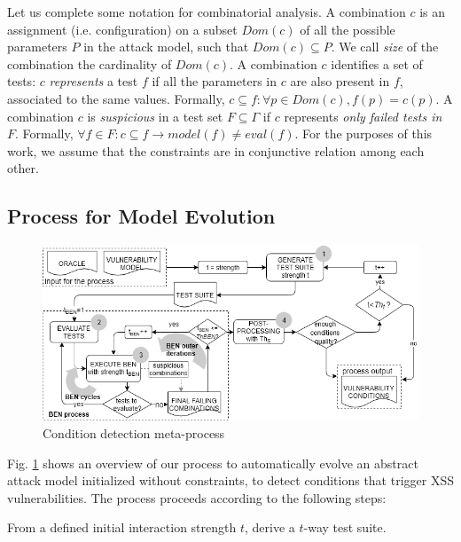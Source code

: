\begin{tikzborder}{\cite{Gargantini16:validation}}
\begin{tikzborder}{\cite{gargantini_combinatorial_2017}}
\begin{tikzborder}{\cite{garn2019}}
Let us complete some notation for combinatorial analysis.
A combination $c$ is an assignment (i.e. configuration) on a subset $Dom(c)$ of all the possible parameters $P$ in the attack model, such that 
$Dom(c) \subseteq P$.
We call \emph{size} of the combination the cardinality of $Dom(c)$.
A combination $c$ identifies %
a set of tests: $c$ \textit{represents} a test $f$ if all the parameters in $c$ are also present in $f$, associated to the same values. Formally, $c \subseteq f: \forall p \in Dom(c), f(p) = c(p)$.
A combination $c$ is \textit{suspicious} in a test set $F \subseteq \Gamma $ if $c$ represents \emph{only failed tests in $F$}. Formally, $\forall f \in F: c \subseteq f \rightarrow model(f) \neq eval(f)$.
For the purposes of this work, we assume that the constraints are in conjunctive relation among each other.
\be 

\subsection{Process for Model Evolution}\label{sec:xssprocess}

\begin{figure}[!hbt]
\centering
\includegraphics[width=.91\textwidth]{metaprocess.png}
\caption{Condition detection meta-process}\label{fig:metaprocess}
\end{figure}

\bb Fig. \ref{fig:metaprocess} shows an overview of our process to automatically evolve an abstract attack model initialized without constraints, to detect conditions that trigger XSS vulnerabilities.
The process proceeds according to the following steps:

\begin{inparaenum}

\item From a defined initial interaction strength $t$,  derive a  $t$-way test suite.


\end{inparaenum}
\end{tikzborder}
\end{tikzborder}
\end{tikzborder}
